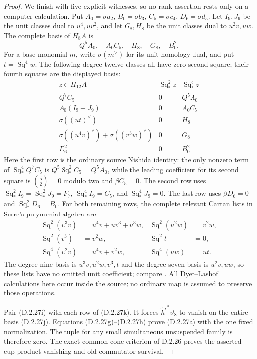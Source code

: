 \begin{proof}
We finish with five explicit witnesses, so no rank assertion
rests only on a computer calculation. Put
$A_0=\sigma a_2$, $B_0=\sigma b_3$, $C_5=\sigma c_4$,
$D_6=\sigma d_5$. Let $I_9,J_9$ be the unit classes dual
to $u^4,uv^2$, and let $G_8,H_8$ be the unit classes dual
to $u^2v,uw$. The complete basis of $H_8A$ is
\[
 Q^5A_0,\quad A_0C_5,\quad H_8,\quad G_8,\quad B_0^2.
 \tag{D.2.27j}
\]
For a base monomial $m$, write $\sigma(m^\vee)$ for its
unit homology dual, and put $t=\operatorname{Sq}^4w$.
The following degree-twelve classes all have zero second
square; their fourth squares are the displayed basis:
\[
\begin{array}{c|c|c}
 z\in H_{12}A&\operatorname{Sq}_*^2z&\operatorname{Sq}_*^4z\\ \hline
 Q^7C_5&0&Q^5A_0\\
 A_0(I_9+J_9)&0&A_0C_5\\
 \sigma((ut)^\vee)&0&H_8\\
 \sigma((u^4v)^\vee)+\sigma((u^3w)^\vee)&0&G_8\\
 D_6^2&0&B_0^2
\end{array}
 \tag{D.2.27k}
\]
Here the first row is the ordinary source Nishida identity:
the only nonzero term of $\operatorname{Sq}_*^4Q^7C_5$
is $Q^5\operatorname{Sq}_*^2C_5=Q^5A_0$, while the
leading coefficient for its second square is
$\binom52=0$ modulo two and $\beta C_5=0$.
The second row uses
$\operatorname{Sq}_*^2I_9=\operatorname{Sq}_*^2J_9=F_7$,
$\operatorname{Sq}_*^4I_9=C_5$, and
$\operatorname{Sq}_*^4J_9=0$.
The last row uses $\beta D_6=0$ and
$\operatorname{Sq}_*^2D_6=B_0$.
For both remaining rows, the complete relevant Cartan lists
in Serre's polynomial algebra are
\[
\begin{aligned}
 \operatorname{Sq}^2(u^3v)&=u^4v+uv^3+u^3w,&
 \operatorname{Sq}^2(u^2w)&=v^2w,\\
 \operatorname{Sq}^2(v^3)&=v^2w,&
 \operatorname{Sq}^2t&=0,\\
 \operatorname{Sq}^4(u^2v)&=u^4v+v^2w,&
 \operatorname{Sq}^4(uw)&=ut.
\end{aligned}
 \tag{D.2.27l}
\]
The degree-nine basis is $u^3v,u^2w,v^3,t$ and the
degree-seven basis is $u^2v,uw$, so these lists have no
omitted unit coefficient; compare
\cite[\S2, nos.~8--9]{I_Serre1953}.
All Dyer--Lashof calculations here occur inside the source;
no ordinary map is assumed to preserve those operations.

Pair \textup{(D.2.27i)} with each row of
\textup{(D.2.27k)}. It forces
$\widetilde h^{,*}\vartheta_8$ to vanish on the entire
basis \textup{(D.2.27j)}. Equations
\textup{(D.2.27g)--(D.2.27h)} prove
\textup{(D.2.27a)} with the one fixed normalization.
The tuple for any small simultaneous unsuspended family
is therefore zero. The exact common-cone criterion of
\textup{D.2.26} proves the asserted cup-product vanishing
and old-commutator survival.


\end{proof}
